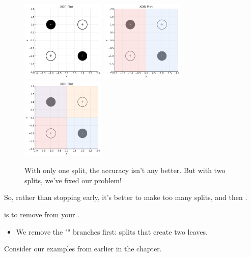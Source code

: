         \begin{figure}[H]
            \centering
            \includegraphics[width=40mm,scale=0.5]{images/nonparametric_images/xor_plot.png}
            \includegraphics[width=40mm,scale=0.5]{images/nonparametric_images/xor_1split.png}
            \includegraphics[width=40mm,scale=0.5]{images/nonparametric_images/xor_2split.png}
            \caption*{With only one split, the accuracy isn't any better. But with two splits, we've fixed our problem!}
        \end{figure}

        So, rather than stopping early, it's better to make too many splits, and then .\\

        \begin{definition}
             is to remove  from your .

            \begin{itemize}
                \item We remove the "" branches first: splits that create two leaves.
            \end{itemize}
        \end{definition}

        \miniex Consider our examples from earlier in the chapter.

